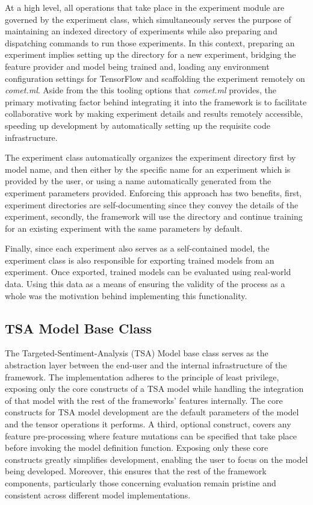 \documentclass[../../fyp.tex]{subfiles}
\begin{document}
At a high level, all operations that take place in the experiment module are governed by the experiment class, which simultaneously serves the purpose of maintaining an indexed directory of experiments while also preparing and dispatching commands to run those experiments. In this context, preparing an experiment implies setting up the directory for a new experiment, bridging the feature provider and model being trained and, loading any environment configuration settings for TensorFlow and scaffolding the experiment remotely on \textit{comet.ml}. Aside from the this tooling options that \textit{comet.ml} provides, the primary motivating factor behind integrating it into the framework is to facilitate collaborative work by making experiment details and results remotely accessible, speeding up development by automatically setting up the requisite code infrastructure.

The experiment class automatically organizes the experiment directory first by model name, and then either by the specific name for an experiment which is provided by the user, or using a name automatically generated from the experiment parameters provided. Enforcing this approach has two benefits, first, experiment directories are self-documenting since they convey the details of the experiment, secondly, the framework will use the directory and continue training for an existing experiment with the same parameters by default.

Finally, since each experiment also serves as a self-contained model, the experiment class is also responsible for exporting trained models from an experiment. Once exported, trained models can be evaluated using real-world data. Using this data as a means of ensuring the validity of the process as a whole was the motivation behind implementing this functionality.

\subsection{TSA Model Base Class}
The Targeted-Sentiment-Analysis (TSA) Model base class serves as the abstraction layer between the end-user and the internal infrastructure of the framework. The implementation adheres to the principle of least privilege, exposing only the core constructs of a TSA model while handling the integration of that model with the rest of the frameworks' features internally. The core constructs for TSA model development are the default parameters of the model and the tensor operations it performs. A third, optional construct, covers any feature pre-processing where feature mutations can be specified that take place before invoking the model definition function. Exposing only these core constructs greatly simplifies development, enabling the user to focus on the model being developed. Moreover, this ensures that the rest of the framework components, particularly those concerning evaluation remain pristine and consistent across different model implementations. 
\end{document}
